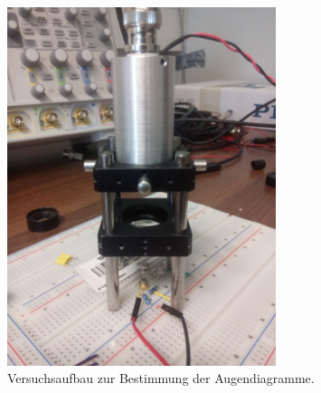 \documentclass[12pt,a4paper]{article}
\begin{document}
\begin{figure}[h!]
  \centering
    \includegraphics[width=0.7\textwidth]{../photos/IMG_20140710_184030.jpg}
  \caption{Versuchsaufbau zur Bestimmung der Augendiagramme.}
  \label{fig:eye_setup}
\end{figure}
\end{document}
